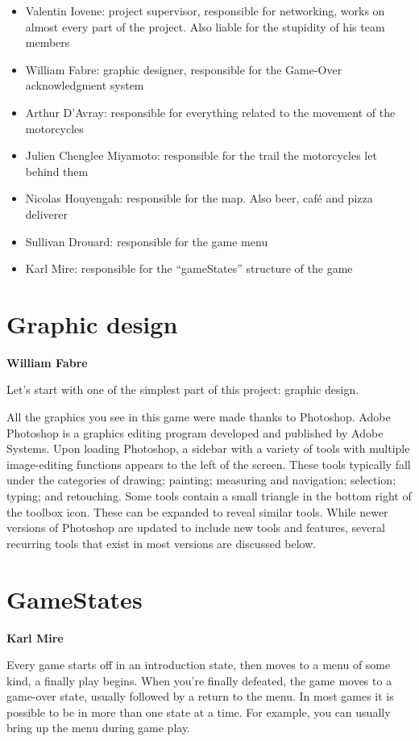 \documentclass[pdftex,12pt,a4paper]{report}
\begin{document}
\begin{itemize}
\itemsep1pt\parskip0pt
\item
  Valentin Iovene: project supervisor, responsible for networking, works
  on almost every part of the project. Also liable for the stupidity of
  his team members
\item
  William Fabre: graphic designer, responsible for the Game-Over
  acknowledgment system
\item
  Arthur D'Avray: responsible for everything related to the movement of
  the motorcycles
\item
  Julien Chenglee Miyamoto: responsible for the trail the motorcycles
  let behind them
\item
  Nicolas Houyengah: responsible for the map. Also beer, café and pizza
  deliverer
\item
  Sullivan Drouard: responsible for the game menu
\item
  Karl Mire: responsible for the ``gameStates'' structure of the game
\end{itemize}

\section{Graphic design}

\textbf{William Fabre}

Let's start with one of the simplest part of this project: graphic
design.

All the graphics you see in this game were made thanks to Photoshop.
Adobe Photoshop is a graphics editing program developed and published by
Adobe Systems. Upon loading Photoshop, a sidebar with a variety of tools
with multiple image-editing functions appears to the left of the screen.
These tools typically fall under the categories of drawing; painting;
measuring and navigation; selection; typing; and retouching. Some tools
contain a small triangle in the bottom right of the toolbox icon. These
can be expanded to reveal similar tools. While newer versions of
Photoshop are updated to include new tools and features, several
recurring tools that exist in most versions are discussed below.

\section{GameStates}

\textbf{Karl Mire}

Every game starts off in an introduction state, then moves to a menu of
some kind, a finally play begins. When you're finally defeated, the game
moves to a game-over state, usually followed by a return to the menu. In
most games it is possible to be in more than one state at a time. For
example, you can usually bring up the menu during game play.
\end{document}
